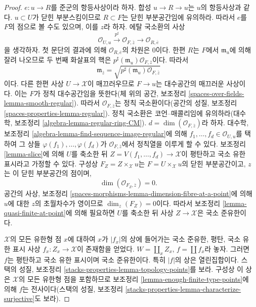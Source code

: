 \begin{proof}
\medskip\noindent
$e : u \to R$를 준군의 항등사상이라 하자. 합성 $u \to R \to u$는
$u$의 항등사상과 같다. $u \subset U$가 닫힌 부분스킴이므로
$R \subset F$는 닫힌 부분공간임에 유의하라. 따라서 $e$를 $F$의 점으로
볼 수도 있으며, 이를 $z$라 하자. 에탈 국소환의 사상
$$
\mathcal{O}_{U, u}
\xrightarrow{p^\sharp}
\mathcal{O}_{F, \overline{z}}
\longrightarrow
\mathcal{O}_{R, \overline{e}}
$$
을 생각하자. 첫 문단의 결과에 의해
$\mathcal{O}_{R, \overline{e}}$의 차원은 $0$이다. 한편 $R$는 $F$에서
$\mathfrak m_u$에 의해 잘려 나오므로 두 번째 화살표의 핵은
$p^\sharp(\mathfrak m_u)\mathcal{O}_{F, \overline{z}}$이다. 따라서
$$
\mathfrak m_{\overline{z}} =
\sqrt{p^\sharp(\mathfrak m_u)\mathcal{O}_{F, \overline{z}}}
$$
이다. 다른 한편 사상 $U \to \mathcal{X}$이 매끄러우므로
$F \to u$는 대수공간의 매끄러운 사상이다. 이는 $F$가 정칙
대수공간임을 뜻한다(체 위의 공간, 보조정리
\ref{spaces-over-fields-lemma-smooth-regular}). 따라서
$\mathcal{O}_{F, \overline{z}}$는 정칙 국소환이다(공간의 성질,
보조정리 \ref{spaces-properties-lemma-regular}). 정칙 국소환은
코언–매콜리임에 유의하라(대수학, 보조정리
\ref{algebra-lemma-regular-ring-CM}).
$d = \dim(\mathcal{O}_{F, \overline{z}})$라 하자. 대수학,
보조정리 \ref{algebra-lemma-find-sequence-image-regular}에 의해
$f_1, \ldots, f_d \in \mathcal{O}_{U, u}$를 택하여 그 상들
$\varphi(f_1), \ldots, \varphi(f_d)$가
$\mathcal{O}_{F, \overline{z}}$에서 정칙열을 이루게 할 수 있다.
보조정리 \ref{lemma-slice}에 의해 $U$를 축소한 뒤
$Z = V(f_1, \ldots, f_d) \to \mathcal{X}$이 평탄하고 국소 유한
표시라고 가정할 수 있다. 구성상
$F_Z = Z \times_\mathcal{X} u$는 $F = U \times_\mathcal{X} u$의 닫힌
부분공간이고, $z$는 이 닫힌 부분공간의 점이며,
$$
\dim(\mathcal{O}_{F_Z, \overline{z}}) = 0.
$$
공간의 사상, 보조정리
\ref{spaces-morphisms-lemma-dimension-fibre-at-a-point}에 의해 $u$에 대한
$z$의 초월차수가 영이므로 $\dim_z(F_Z) = 0$이다. 따라서 보조정리
\ref{lemma-quasi-finite-at-point}에 의해 필요하면 $U$를 축소한 뒤 사상
$Z \to \mathcal{X}$은 국소 준유한이다.

\medskip\noindent
$\mathcal{X}$의 모든 유한형 점 $x$에 대하여 $x$가 $|f_x|$의 상에
들어가는 국소 준유한, 평탄, 국소 유한 표시 사상
$f_x : Z_x \to \mathcal{X}$이 존재함을 얻었다.
$W = \coprod_x Z_x$, $f = \coprod f_x$라 놓자. 그러면 $f$는 평탄하고
국소 유한 표시이며 국소 준유한이다. 특히 $|f|$의 상은 열린집합이다.
스택의 성질, 보조정리 \ref{stacks-properties-lemma-topology-points}를 보라.
구성상 이 상은 $\mathcal{X}$의 모든 유한형 점을 포함하므로 보조정리
\ref{lemma-enough-finite-type-points}에 의해 $f$는 전사이다(스택의 성질,
보조정리 \ref{stacks-properties-lemma-characterize-surjective}도 보라).
\end{proof}

